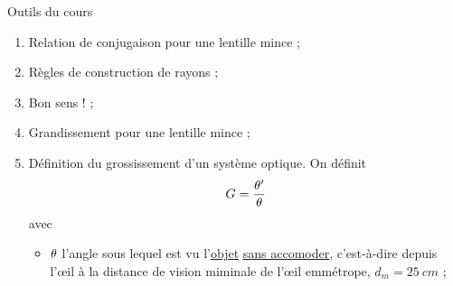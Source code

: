 \documentclass[10pt,a5paper,notitlepage]{book}
\begin{document}
\begin{NCdemo}{Outils du cours}
   \begin{enumerate}
        \item Relation de conjugaison pour une lentille mince ;
        \item Règles de construction de rayons ;
        \item Bon sens ! ;
        \item Grandissement pour une lentille mince ;
        \item Définition du grossissement d'un système optique. On définit
            \[ G = \frac{\theta'}{\theta} \]
            avec
            \begin{itemize}
                \item $\theta$ l'angle sous lequel est vu l'\underline{objet}
                    \underline{\underline{sans accomoder}}, c'est-à-dire depuis
                    l'œil à la distance de vision miminale de l'œil
                    emmétrope, $d_m = \SI{25}{cm}$ ;
            \end{itemize}
            \begin{center}
\end{center}
\end{enumerate}
\end{NCdemo}
\end{document}
